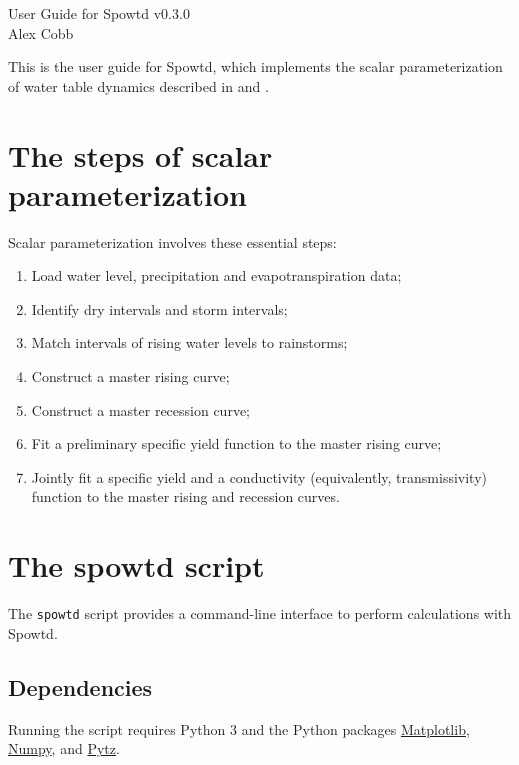 \documentclass[11pt,a4paper]{article}
\begin{document}
\lstset{language=bash}

{\huge User Guide for Spowtd v0.3.0}\\[2ex]
{\large Alex Cobb}\\[0ex]

\renewcommand{\baselinestretch}{1.18}\normalsize

This is the user guide for Spowtd, which implements the scalar
parameterization of water table dynamics described in
\citet{Cobb_et_al_2017} and \citet{Cobb_and_Harvey_2019}.

\section{The steps of scalar parameterization}
Scalar parameterization involves these essential steps:
\begin{enumerate}
\item Load water level, precipitation and evapotranspiration data;
\item Identify dry intervals and storm intervals;
\item Match intervals of rising water levels to rainstorms;
\item Construct a master rising curve;
\item Construct a master recession curve;
\item Fit a preliminary specific yield function to the master rising
  curve;
\item Jointly fit a specific yield and a conductivity (equivalently,
  transmissivity) function to the master rising and recession curves.
\end{enumerate}

\section{The spowtd script}
The \texttt{spowtd} script provides a command-line interface to
perform calculations with Spowtd.

\subsection{Dependencies}
Running the script requires Python 3 and the Python packages
\href{https://matplotlib.org/}{Matplotlib},
\href{https://numpy.org/}{Numpy}, and
\href{https://pypi.org/project/pytz/}{Pytz}.
\end{document}
